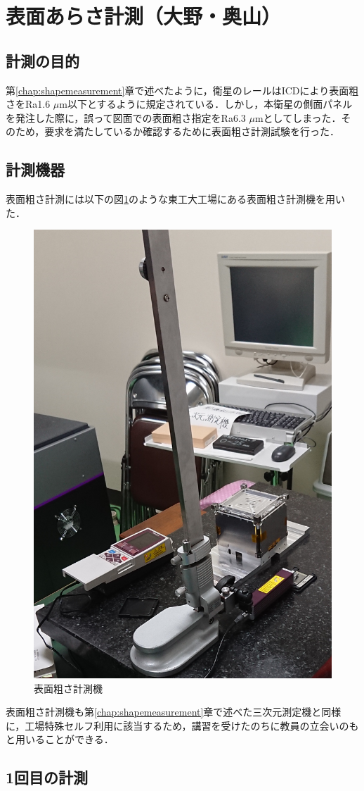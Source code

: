 \section{表面あらさ計測（大野・奥山）}
\label{chap:surfaceroughness}

\subsection{計測の目的}

第\ref{chap:shapemeasurement}章で述べたように，衛星のレールはICDにより表面粗さをRa1.6 $\mu$m以下とするように規定されている．しかし，本衛星の側面パネルを発注した際に，誤って図面での表面粗さ指定をRa6.3 $\mu$mとしてしまった．そのため，要求を満たしているか確認するために表面粗さ計測試験を行った．

\subsection{計測機器}

表面粗さ計測には以下の図\ref{fig:surfaceroughness}のような東工大工場にある表面粗さ計測機を用いた．

\begin{figure}[h]
	\begin{center}
		
		\includegraphics[width=0.3\linewidth]{04/fig/surfaceroughness.jpg}
		\caption{表面粗さ計測機}
		\label{fig:surfaceroughness}
		
	\end{center}
\end{figure}

表面粗さ計測機も第\ref{chap:shapemeasurement}章で述べた三次元測定機と同様に，工場特殊セルフ利用に該当するため，講習を受けたのちに教員の立会いのもと用いることができる．

\subsection{1回目の計測}

